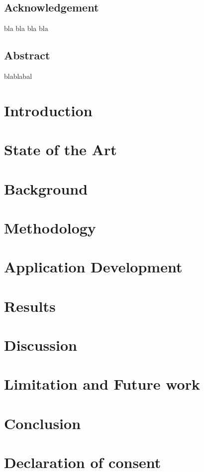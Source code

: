 \documentclass [12pt]{book}
\begin{document}

\section*{Acknowledgement}
bla bla bla bla
\newpage
\section*{Abstract}
blablabal
\tableofcontents
\listoffigures


\printglossary[type=\acronymtype, title=Abbreviations, nonumberlist]


\chapter{Introduction}

\chapter{State of the Art }

\chapter{Background}

\chapter{Methodology}

\chapter{Application Development}

\chapter{Results}

\chapter{Discussion}

\chapter{Limitation and Future work}

\chapter{Conclusion}





\appendix
\chapter{Declaration of consent}

\end{document}
